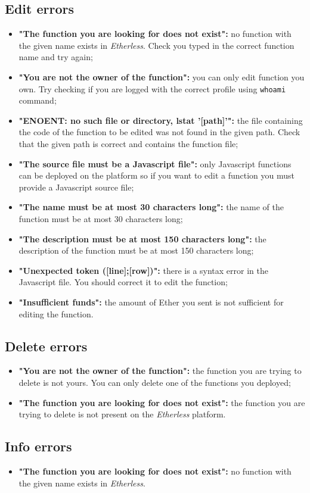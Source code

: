   \subsection{Edit errors}
  \begin{itemize}
   \item \textbf{"The function you are looking for does not exist":} no function with the given name exists in \textit{Etherless}. Check you typed in the correct function name and try again;
    \item \textbf{"You are not the owner of the function":} you can only edit function you own. Try checking if you are logged with the correct profile using \texttt{whoami} command;
    \item \textbf{"ENOENT: no such file or directory, lstat '[path]'":} the file containing the code of the function to be edited was not found in the given path. Check that the given path is correct and contains the function file;
     \item \textbf{"The source file must be a Javascript file":} only Javascript functions can be deployed on the platform so if you want to edit a function you must provide a Javascript source file;
    \item \textbf{"The name must be at most 30 characters long":} the name of the function must be at most 30 characters long;
    \item \textbf{"The description must be at most 150 characters long":} the description of the function must be at most 150 characters long;
    \item \textbf{"Unexpected token ([line];[row])":} there is a syntax error in the Javascript file. You should correct it to edit the function; 
    \item \textbf{"Insufficient funds":} the amount of Ether you sent is not sufficient for editing the function.
  \end{itemize}
  
  \subsection{Delete errors}
  \begin{itemize}
    \item \textbf{"You are not the owner of the function":} the function you are trying to delete is not yours. You can only delete one of the functions you deployed;
    \item \textbf{"The function you are looking for does not exist":} the function you are trying to delete is not present on the \textit{Etherless} platform.
  \end{itemize}
  
  \subsection{Info errors}
  \begin{itemize}
    \item \textbf{"The function you are looking for does not exist":} no function with the given name exists in \textit{Etherless}.
  \end{itemize}
